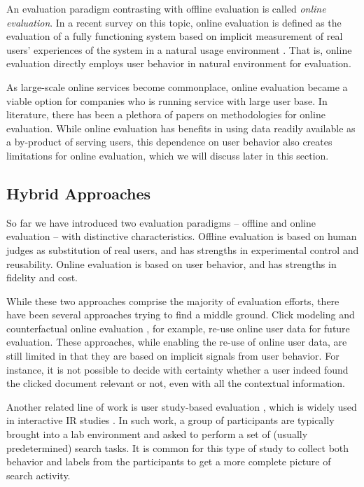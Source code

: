 An evaluation paradigm contrasting with offline evaluation is called \textit{online evaluation}. In a recent survey on this topic, online evaluation is defined as the evaluation of a fully functioning system based on implicit measurement of real users' experiences of the system in a natural usage environment \citep{INR-XYZ}. That is, online evaluation directly employs user behavior in natural environment for evaluation.

As large-scale online services become commonplace, online evaluation became a viable option for companies who is running service with large user base. In literature, there has been a plethora of papers on methodologies for online evaluation. While online evaluation has benefits in using data readily available as a by-product of serving users, this dependence on user behavior also creates limitations for online evaluation, which we will discuss later in this section.

\subsection{Hybrid Approaches}

So far we have introduced two evaluation paradigms -- offline and online evaluation -- with distinctive characteristics. Offline evaluation is based on human judges as substitution of real users, and has strengths in experimental control and reusability. Online evaluation is based on user behavior, and has strengths in fidelity and cost.


While these two approaches comprise the majority of evaluation efforts, there have been several approaches trying to find a middle ground. Click modeling \citep{chuklin2015click} and counterfactual online evaluation \citep{Li:2015, li2010contextual}, for example, re-use online user data for future evaluation. These approaches, while enabling the re-use of online user data, are still limited in that they are based on implicit signals from user behavior. For instance, it is not possible to decide with certainty whether a user indeed found the clicked document relevant or not, even with all the contextual information.


Another related line of work is user study-based evaluation \citep{Bron:2013, Liu:2014, Shah:2011}, which is widely used in interactive IR studies \citep{kelly2009methods}. In such work, a group of participants are typically brought into a lab environment and asked to perform a set of (usually predetermined) search tasks. It is common for this type of study to collect both behavior and labels from the participants to get a more complete picture of search activity. 


